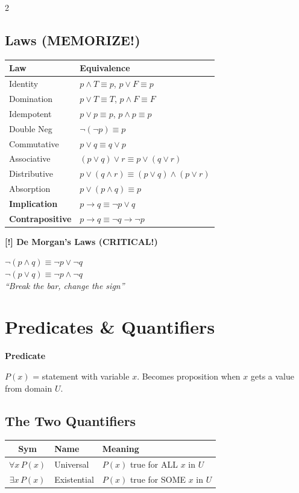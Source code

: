 \documentclass[8pt,a4paper]{article}
\newenvironment{defbox}[1][]{\vspace{2pt}\noindent\textbf{#1}\par\smallskip}{\vspace{2pt}}
\newenvironment{warnbox}[1][]{\vspace{2pt}\noindent\textbf{[!] #1}\par\smallskip}{\vspace{2pt}}
\begin{document}
\begin{multicols}{2}
\subsection{Laws (MEMORIZE!)}
\begin{center}
\scriptsize
\begin{tabular}{l|l}
\textbf{Law} & \textbf{Equivalence} \\
\hline
Identity & $p \land T \equiv p$, $p \lor F \equiv p$ \\
Domination & $p \lor T \equiv T$, $p \land F \equiv F$ \\
Idempotent & $p \lor p \equiv p$, $p \land p \equiv p$ \\
Double Neg & $\neg(\neg p) \equiv p$ \\
Commutative & $p \lor q \equiv q \lor p$ \\
Associative & $(p \lor q) \lor r \equiv p \lor (q \lor r)$ \\
Distributive & $p \lor (q \land r) \equiv (p \lor q) \land (p \lor r)$ \\
Absorption & $p \lor (p \land q) \equiv p$ \\
\textbf{Implication} & $p \to q \equiv \neg p \lor q$ \\
\textbf{Contrapositive} & $p \to q \equiv \neg q \to \neg p$ \\
\end{tabular}
\end{center}

\begin{warnbox}[De Morgan's Laws (CRITICAL!)]
$\neg(p \land q) \equiv \neg p \lor \neg q$\\
$\neg(p \lor q) \equiv \neg p \land \neg q$\\
\textit{``Break the bar, change the sign''}
\end{warnbox}

\section{Predicates \& Quantifiers}

\begin{defbox}[Predicate]
$P(x)$ = statement with variable $x$. Becomes proposition when $x$ gets a value from domain $U$.
\end{defbox}

\subsection{The Two Quantifiers}
\begin{center}
\scriptsize
\begin{tabular}{c|l|l}
\textbf{Sym} & \textbf{Name} & \textbf{Meaning} \\
\hline
$\forall x\, P(x)$ & Universal & $P(x)$ true for ALL $x$ in $U$ \\
$\exists x\, P(x)$ & Existential & $P(x)$ true for SOME $x$ in $U$ \\
\end{tabular}
\end{center}


\end{multicols}
\end{document}

